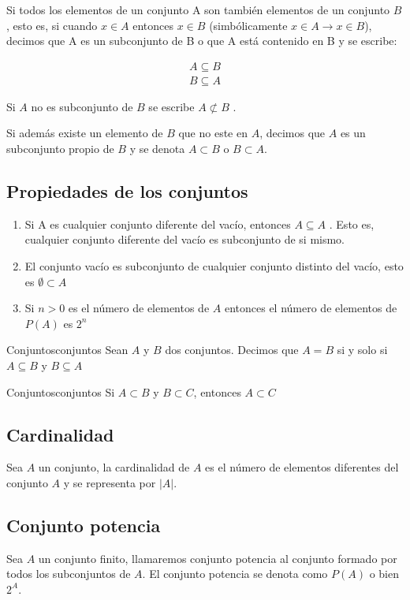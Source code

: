 Si todos los elementos de un conjunto A son también elementos de un conjunto
$B$, esto es, si cuando $x \in A$ entonces $x \in B$ (simbólicamente $x \in A
\rightarrow x \in B$), decimos que A es un subconjunto de B o que A está
contenido en B y se escribe:

\begin{equation}
    \begin{array}{l}
        A \subseteq B \\
        B \subseteq A
    \end{array}
\end{equation}

Si $A$ no es subconjunto de $B$ se escribe $A \not \subset B$ .

Si además existe un elemento de $B$ que no este en $A$, decimos que $A$ es un
subconjunto propio de $B$ y se denota $A \subset B$ o $B \subset A$.

\subsection{Propiedades de los conjuntos}

\begin{enumerate}
    \item Si A es cualquier conjunto diferente del vacío, entonces $A \subseteq A$ . Esto es, cualquier conjunto
    diferente del vacío es subconjunto de si mismo.
    
\item El conjunto vacío es subconjunto de cualquier conjunto distinto del vacío,
esto es $\emptyset \subset A$

\item Si $n>0$ es el número de elementos de $A$ entonces el número de elementos de $P(A)$ es $2^n$
\end{enumerate}

\begin{theorem}{Conjuntos}{conjuntos}
Sean $A$ y $B$ dos conjuntos. Decimos que $A=B$ si y solo si $A \subseteq B$ y
$B \subseteq A$
\end{theorem}

\begin{theorem}{Conjuntos}{conjuntos}
    Si $ A \subset B $ y $ B \subset C $, entonces $ A \subset C $
\end{theorem}

\subsection{Cardinalidad}

Sea $A$ un conjunto, la cardinalidad de $A$ es el número de elementos diferentes del conjunto
$A$ y se representa por $|A|$.

\subsection{Conjunto potencia}
Sea $A$ un conjunto finito, llamaremos conjunto potencia al conjunto formado por todos los
subconjuntos de $A$. El conjunto potencia se denota como $P(A)$ o bien $2^A$.
